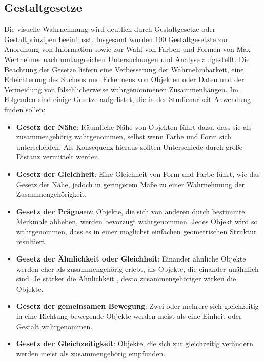 \subsection{Gestaltgesetze}
Die visuelle Wahrnehmung wird deutlich durch Gestaltgesetze oder Gestaltprinzipen beeinflusst. Insgesamt wurden 100 Gestaltgesetzte zur Anordnung von Information sowie zur Wahl von Farben und Formen von Max Wertheimer nach umfangreichen Untersuchungen und Analyse aufgestellt. Die Beachtung der Gesetze liefern eine Verbesserung der Wahrnehmbarkeit, eine Erleichterung des Suchens und Erkennens von Objekten oder Daten und der Vermeidung von fälschlicherweise wahrgenommenen Zusammenhängen. \cite[S. 55 f.]{2010.Preim} Im Folgenden sind einige Gesetze aufgelistet, die in der Studienarbeit Anwendung finden sollen:

\begin{itemize}
    \item \textbf{Gesetz der Nähe}: Räumliche Nähe von Objekten führt dazu, dass sie als zusammengehörig wahrgenommen, selbst wenn Farbe und Form sich unterscheiden. Als Konsequenz hieraus sollten Unterschiede durch große Distanz vermittelt werden. \cite[S. 56]{2010.Preim}
    \item \textbf{Gesetz der Gleichheit}: Eine Gleichheit von Form und Farbe führt, wie das Gesetz der Nähe, jedoch in geringerem Maße zu einer Wahrnehmung der Zusammengehörigkeit. \cite[S. 56]{2010.Preim}
    \item \textbf{Gesetz der Prägnanz}: Objekte, die sich von anderen durch bestimmte Merkmale abheben, werden bevorzugt wahrgenommen. Jedes Objekt wird so wahrgenommen, dass es in einer möglichst einfachen geometrischen Struktur resultiert. \cite{Gestaltgesetze}
    \item \textbf{Gesetz der Ähnlichkeit oder Gleichheit}: Einander ähnliche Objekte werden eher als zusammengehörig erlebt, als Objekte, die einander unähnlich sind. Je stärker die Ähnlichkeit , desto zusammengehöriger wirken die Objekte. \cite{Gestaltgesetze}
    \item \textbf{Gesetz der gemeinsamen Bewegung}: Zwei oder mehrere sich gleichzeitig in eine Richtung bewegende Objekte werden meist als eine Einheit oder Gestalt wahrgenommen. \cite{Gestaltgesetze}
    \item \textbf{Gesetz der Gleichzeitigkeit}: Objekte, die sich zur gleichzeitig verändern werden meist als zusammengehörig empfunden. \cite{Gestaltgesetze}
\end{itemize}


